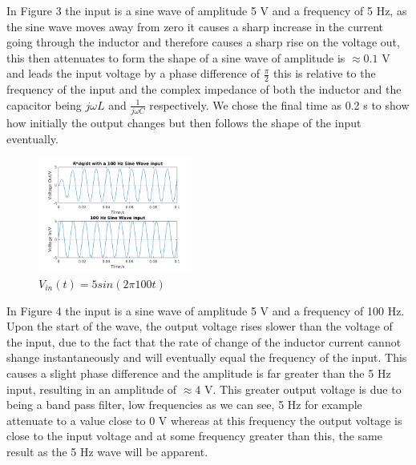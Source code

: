 \documentclass[11pt,a4paper]{article}
\begin{document}
\vspace{0mm}In Figure 3 the input is a sine wave of amplitude 5 V and a frequency of 5 Hz, as the sine wave moves away from zero it causes a sharp increase in the current going through the inductor and therefore causes a sharp rise on the voltage out, this then attenuates to form the shape of a sine wave of amplitude is $\approx 0.1$ V and leads the input voltage by a phase difference of $\frac{\pi}{2}$ this is relative to the frequency of the input and the complex impedance of both the inductor and the capacitor being $j\omega L$ and $\frac{1}{j\omega C}$ respectively. We chose the final time as 0.2 s to show how initially the output changes but then follows the shape of the input eventually.

\begin{figure}
    \vspace{-15mm}
  		\includegraphics[width=0.45\textwidth]{Ex3_Figs/100Sine.png}
	\vspace{-6mm}
  	\caption{$V_{in}(t)= 5sin(2 \pi 100t)$}
  	\label{fig:ex3g3}
\end{figure}

\vspace{6mm}In Figure 4 the input is a sine wave of amplitude 5 V and a frequency of 100 Hz. Upon the start of the wave, the output voltage rises slower than the voltage of the input, due to the fact that the rate of change of the inductor current cannot shange instantaneously and will eventually equal the frequency of the input. This causes a slight phase difference and the amplitude is far greater than the 5 Hz input, resulting in an amplitude of $\approx 4$ V. This greater output voltage is due to being a band pass filter, low frequencies as we can see, 5 Hz for example attenuate to a value close to 0 V whereas at this frequency the output voltage is close to the input voltage and at some frequency greater than this, the same result as the 5 Hz wave will be apparent.
\end{document}
